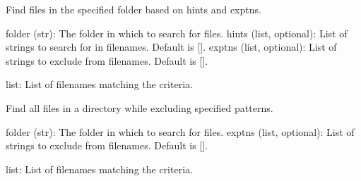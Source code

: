\documentclass[letterpaper,10pt,english]{sphinxmanual}
\begin{document}
\begin{fulllineitems}
\label{\detokenize{autoapi/unduwave/helpers/file_folder_helpers/index:unduwave.helpers.file_folder_helpers.find_files_exptn}}
\pysigstartsignatures
{}
\pysigstopsignatures
\sphinxAtStartPar
Find files in the specified folder based on hints and exptns.
\begin{description}
\sphinxAtStartPar
folder (str): The folder in which to search for files.
hints (list, optional): List of strings to search for in filenames. Default is {[}{]}.
exptns (list, optional): List of strings to exclude from filenames. Default is {[}{]}.

\sphinxAtStartPar
list: List of filenames matching the criteria.

\end{description}

\end{fulllineitems}


\begin{fulllineitems}
\label{\detokenize{autoapi/unduwave/helpers/file_folder_helpers/index:unduwave.helpers.file_folder_helpers.find_all_files_exptn}}
\pysigstartsignatures
{}
\pysigstopsignatures
\sphinxAtStartPar
Find all files in a directory while excluding specified patterns.
\begin{description}
\sphinxAtStartPar
folder (str): The folder in which to search for files.
exptns (list, optional): List of strings to exclude from filenames. Default is {[}{]}.

\sphinxAtStartPar
list: List of filenames matching the criteria.

\end{description}

\end{fulllineitems}
\end{document}
